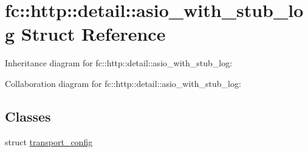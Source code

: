 \hypertarget{structfc_1_1http_1_1detail_1_1asio__with__stub__log}{}\section{fc\+:\+:http\+:\+:detail\+:\+:asio\+\_\+with\+\_\+stub\+\_\+log Struct Reference}
\label{structfc_1_1http_1_1detail_1_1asio__with__stub__log}


Inheritance diagram for fc\+:\+:http\+:\+:detail\+:\+:asio\+\_\+with\+\_\+stub\+\_\+log\+:


Collaboration diagram for fc\+:\+:http\+:\+:detail\+:\+:asio\+\_\+with\+\_\+stub\+\_\+log\+:
\subsection*{Classes}
\begin{DoxyCompactItemize}
\item 
struct \mbox{\hyperlink{structfc_1_1http_1_1detail_1_1asio__with__stub__log_1_1transport__config}{transport\+\_\+config}}
\end{DoxyCompactItemize}
